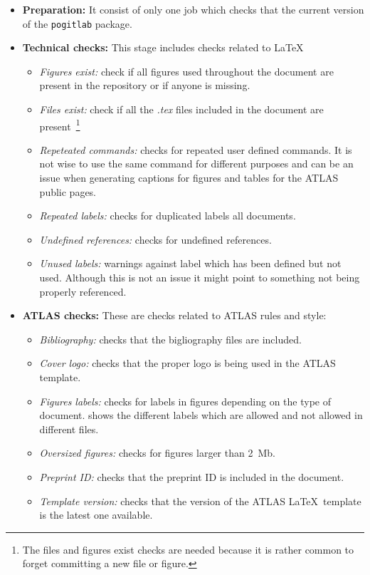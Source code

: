 \begin{itemize}
  \item \textbf{Preparation:} It consist of only one job which checks that the current version of the \texttt{pogitlab} package.
  \item \textbf{Technical checks:} This stage includes checks related to \LaTeX\:
  \begin{itemize}
    \item \textit{Figures exist:} check if all figures used throughout the document are present in the repository or if anyone is missing.
    \item \textit{Files exist:} check if all the \textit{.tex} files included in the document are present~\footnote{The files and figures exist checks are needed because it is rather common to forget committing a new file or figure.}
    \item \textit{Repeteated commands:} checks for repeated user defined commands. It is not wise to use the same command for different purposes and can be an issue when generating captions for figures and tables for the ATLAS public pages.
    \item \textit{Repeated labels:} checks for duplicated labels all documents.
    \item \textit{Undefined references:} checks for undefined references.
    \item \textit{Unused labels:} warnings against label which has been defined but not used. Although this is not an issue it might point to something not being properly referenced.
  \end{itemize}
  \item \textbf{ATLAS checks:} These are checks related to ATLAS rules and style:
  \begin{itemize}
    \item \textit{Bibliography:} checks that the bigliography files are included.
    \item \textit{Cover logo:} checks that the proper logo is being used in the ATLAS template.
    \item \textit{Figures labels:} checks for labels in figures depending on the type of document. \Tab{\ref{tab:labels-files}} shows the different labels which are allowed and not allowed in different files.
    \item \textit{Oversized figures:} checks for figures larger than 2~Mb.
    \item \textit{Preprint ID:} checks that the preprint ID is included in the document.
    \item \textit{Template version:} checks that the version of the ATLAS \LaTeX\ template is the latest one available.

\end{itemize}
\end{itemize}
